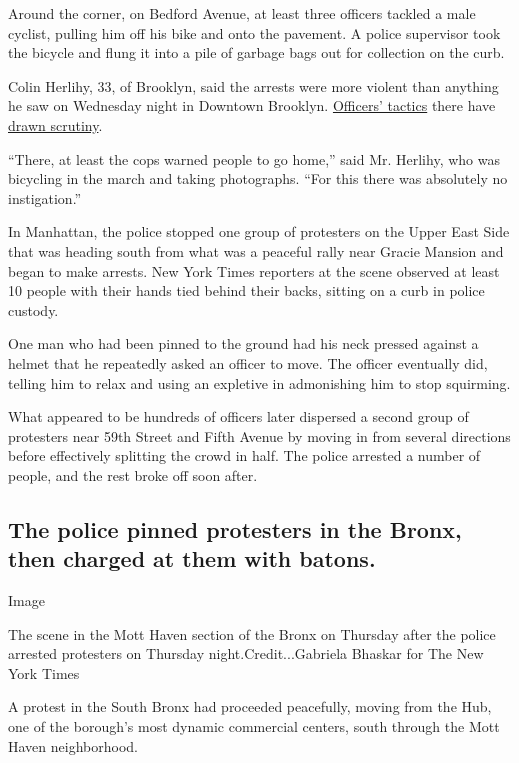 Around the corner, on Bedford Avenue, at least three officers tackled a
male cyclist, pulling him off his bike and onto the pavement. A police
supervisor took the bicycle and flung it into a pile of garbage bags out
for collection on the curb.

Colin Herlihy, 33, of Brooklyn, said the arrests were more violent than
anything he saw on Wednesday night in Downtown Brooklyn.
\href{https://twitter.com/AliWatkins/status/1268354710139961347}{Officers'
tactics} there have
\href{https://twitter.com/JumaaneWilliams/status/1268351817374674951}{drawn
scrutiny}.

``There, at least the cops warned people to go home,'' said Mr. Herlihy,
who was bicycling in the march and taking photographs. ``For this there
was absolutely no instigation.''

In Manhattan, the police stopped one group of protesters on the Upper
East Side that was heading south from what was a peaceful rally near
Gracie Mansion and began to make arrests. New York Times reporters at
the scene observed at least 10 people with their hands tied behind their
backs, sitting on a curb in police custody.

One man who had been pinned to the ground had his neck pressed against a
helmet that he repeatedly asked an officer to move. The officer
eventually did, telling him to relax and using an expletive in
admonishing him to stop squirming.

What appeared to be hundreds of officers later dispersed a second group
of protesters near 59th Street and Fifth Avenue by moving in from
several directions before effectively splitting the crowd in half. The
police arrested a number of people, and the rest broke off soon after.

\hypertarget{the-police-pinned-protesters-in-the-bronx-then-charged-at-them-with-batons}{%
\subsection{The police pinned protesters in the Bronx, then charged at
them with
batons.}\label{the-police-pinned-protesters-in-the-bronx-then-charged-at-them-with-batons}}

Image

The scene in the Mott Haven section of the Bronx on Thursday after the
police arrested protesters on Thursday night.Credit...Gabriela Bhaskar
for The New York Times

A protest in the South Bronx had proceeded peacefully, moving from the
Hub, one of the borough's most dynamic commercial centers, south through
the Mott Haven neighborhood.

